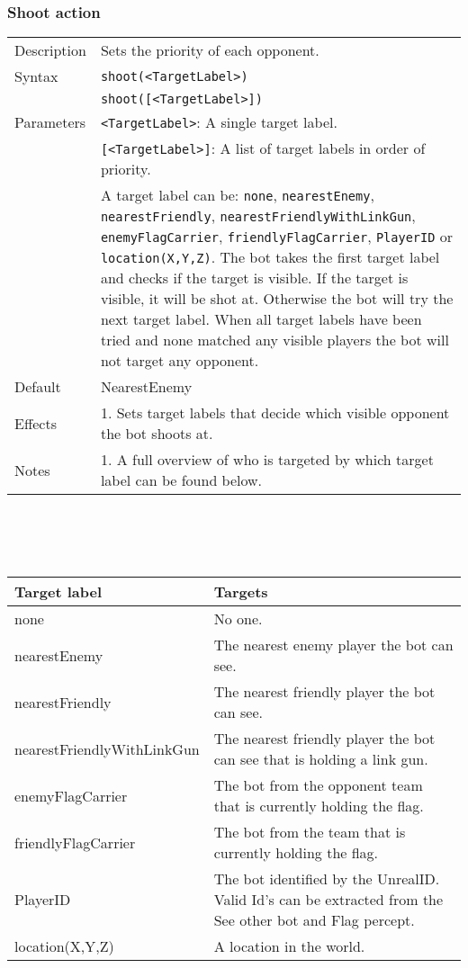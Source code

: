 \documentclass[11pt,a4paper]{article}
\begin{document}
\subsubsection*{Shoot action}
\begin{small}
\begin{tabular}{p{2cm}p{9cm}}
Description & Sets the priority of each opponent.\\
Syntax & \verb|shoot(<TargetLabel>)|\\
	& \verb|shoot([<TargetLabel>])|\\

Parameters 	& \verb|<TargetLabel>|: A single target label. \\
		& \verb|[<TargetLabel>]|: A list of target labels in order of priority.\\
		&  A target label can be: \verb|none|, \verb|nearestEnemy|, \verb|nearestFriendly|, \verb|nearestFriendlyWithLinkGun|, \verb|enemyFlagCarrier|, \verb|friendlyFlagCarrier|, \verb|PlayerID| or \verb|location(X,Y,Z)|. The bot takes the first target label and checks if the target is visible. If the target is visible, it will be shot at. Otherwise the bot will try the next target label. When all target labels have been tried and none matched any visible players the bot will not target any opponent.\\

Default & NearestEnemy\\

Effects & 
	1.	Sets target labels that decide which visible opponent the bot shoots at.\\
Notes &
		1.	A full overview of who is targeted by which target label can be found below. \\


\end{tabular}
	\\\\\\

\begin{tabular}{|p{4cm}|p{7cm}|}	
	\hline
Target label & Targets\\
\hline
none & No one. \\
nearestEnemy & The nearest enemy player the bot can see. \\
nearestFriendly &  The nearest friendly player the bot can see. \\
nearestFriendlyWithLinkGun & The nearest friendly player the bot can see that is holding a link gun. \\
enemyFlagCarrier & The bot from the opponent team that is currently holding the flag. \\
friendlyFlagCarrier & The bot from the team that is currently holding the flag.\\
PlayerID & The bot identified by the UnrealID. Valid Id's can be extracted from the See other bot and Flag percept. \\
location(X,Y,Z) & A location in the world.\\
\hline
\end{tabular}
\end{small}
\end{document}
